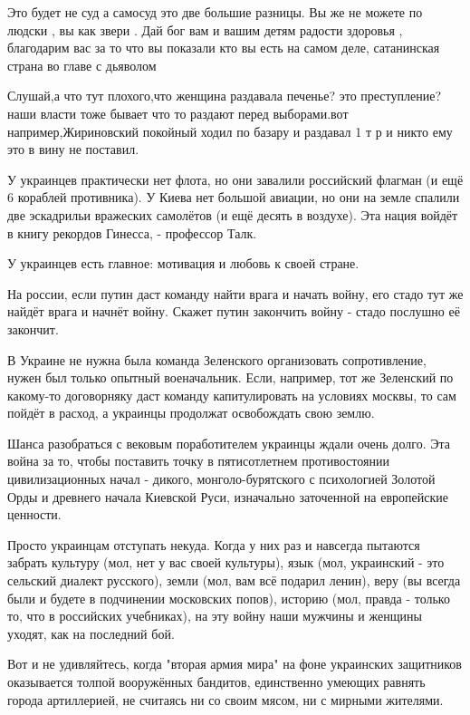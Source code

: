 {%

Это будет не суд а самосуд это две большие разницы. Вы же не можете по людски ,
вы как звери . Дай бог вам и вашим детям радости здоровья , благодарим вас за
то что вы показали кто вы есть на самом деле, сатанинская страна во главе с
дьяволом


Слушай,а что тут плохого,что женщина раздавала печенье? это преступление? наши
власти тоже бывает что то раздают перед выборами.вот например,Жириновский
покойный ходил по базару и раздавал 1 т р и никто ему это в вину не поставил.


У украинцев практически нет флота, но они завалили российский флагман (и ещё 6
кораблей противника). У Киева нет большой авиации, но они на земле спалили две
эскадрильи вражеских самолётов (и ещё десять в воздухе). Эта нация войдёт в
книгу рекордов Гинесса, - профессор Талк. 

У украинцев есть главное: мотивация и любовь к своей стране. 


На россии, если путин даст команду найти врага и начать войну, его стадо тут же
найдёт врага и начнёт войну. Скажет путин закончить войну - стадо послушно её
закончит.

В Украине не нужна была команда Зеленского организовать сопротивление, нужен
был только опытный военачальник. Если, например, тот же Зеленский по какому-то
договорняку даст команду капитулировать на условиях москвы, то сам пойдёт в
расход, а украинцы продолжат освобождать свою землю. 

Шанса разобраться с вековым поработителем украинцы ждали очень долго. Эта война
за то, чтобы поставить точку в пятисотлетнем противостоянии цивилизационных
начал - дикого, монголо-бурятского с психологией Золотой Орды и древнего начала
Киевской Руси, изначально заточенной на европейские ценности.

Просто украинцам отступать некуда. Когда у них раз и навсегда пытаются забрать
культуру (мол, нет у вас своей культуры), язык (мол, украинский - это сельский
диалект русского), земли (мол, вам всё подарил ленин), веру (вы всегда были и
будете в подчинении московских попов), историю (мол, правда - только то, что в
российских учебниках), на эту войну наши мужчины и женщины уходят, как на
последний бой.

Вот и не удивляйтесь, когда "вторая армия мира" на фоне украинских защитников
оказывается толпой вооружённых бандитов, единственно умеющих равнять города
артиллерией, не считаясь ни со своим мясом, ни с мирными жителями.

}
